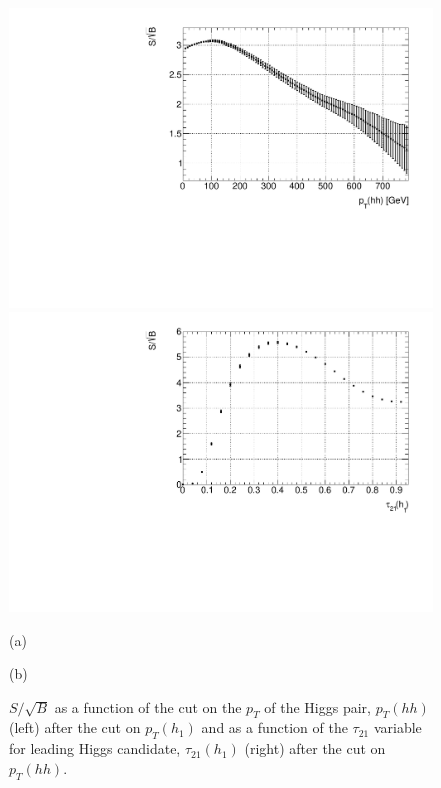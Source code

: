 \begin{figure}
	\centering
	\begin{minipage}{.5\textwidth}
		\centering
		\includegraphics[trim={.6cm 0 0 0},clip,width=\linewidth]{./Figures/SSB_hh_pt.pdf}
	\end{minipage}%
	\begin{minipage}{.5\textwidth}
		\centering
		\includegraphics[trim={0 0 .65cm 0},clip,width=\linewidth]{./Figures/SSB_h1_tau21.pdf}
	\end{minipage}
	\begin{minipage}[t]{0.5\textwidth}
		\caption*{(a)}
	\end{minipage}%
	\hfill
	\begin{minipage}[t]{0.5\textwidth}
		\caption*{(b)}
	\end{minipage}
	\caption{$S/\sqrt{B}$ as a function of the cut on the $p_T$ of the Higgs pair, $p_T(hh)$ (left) after the cut on $p_T(h_1)$ and as a function of the $\tau_{21}$ variable for leading Higgs candidate, $\tau_{21}(h_1)$ (right) after the cut on $p_T(hh)$.}
	\label{fig:SSB_hh_pt}
\end{figure} 

